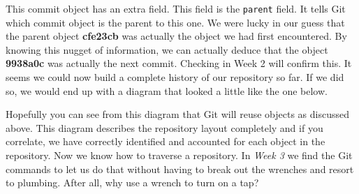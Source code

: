 This commit object has an extra field.
This field is the \texttt{parent} field.
It tells Git which commit object is the parent to this one.
We were lucky in our guess that the parent object \textbf{cfe23cb} was actually the object we had first encountered.
By knowing this nugget of information, we can actually deduce that the object \textbf{9938a0c} was actually the next commit.
Checking in Week 2 will confirm this.
It seems we could now build a complete history of our repository so far.
If we did so, we would end up with a diagram that looked a little like the one below.


Hopefully you can see from this diagram that Git will reuse objects as discussed above.
This diagram describes the repository layout completely and if you correlate, we have correctly identified and accounted for each object in the repository.
Now we know how to traverse a repository.
In \emph{Week 3} we find the Git commands to let us do that without having to break out the wrenches and resort to plumbing.
After all, why use a wrench to turn on a tap?
